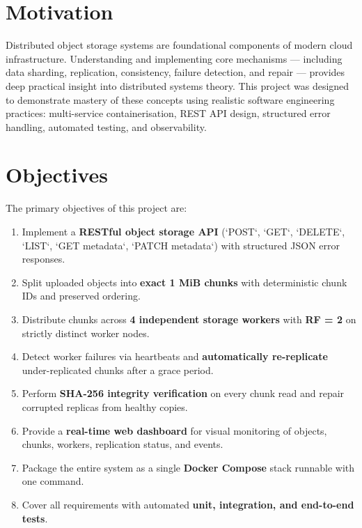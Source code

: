 \documentclass[12pt,a4paper]{report}
\begin{document}
\section{Motivation}

Distributed object storage systems are foundational components of modern cloud infrastructure. Understanding and implementing core mechanisms --- including data sharding, replication, consistency, failure detection, and repair --- provides deep practical insight into distributed systems theory. This project was designed to demonstrate mastery of these concepts using realistic software engineering practices: multi-service containerisation, REST API design, structured error handling, automated testing, and observability.

\section{Objectives}

The primary objectives of this project are:

\begin{enumerate}[leftmargin=*, label=\textbf{O\arabic*.}]
  \item Implement a \textbf{RESTful object storage API} (`POST`, `GET`, `DELETE`, `LIST`, `GET metadata`, `PATCH metadata`) with structured JSON error responses.
  \item Split uploaded objects into \textbf{exact 1 MiB chunks} with deterministic chunk IDs and preserved ordering.
  \item Distribute chunks across \textbf{4 independent storage workers} with \textbf{RF = 2} on strictly distinct worker nodes.
  \item Detect worker failures via heartbeats and \textbf{automatically re-replicate} under-replicated chunks after a grace period.
  \item Perform \textbf{SHA-256 integrity verification} on every chunk read and repair corrupted replicas from healthy copies.
  \item Provide a \textbf{real-time web dashboard} for visual monitoring of objects, chunks, workers, replication status, and events.
  \item Package the entire system as a single \textbf{Docker Compose} stack runnable with one command.
  \item Cover all requirements with automated \textbf{unit, integration, and end-to-end tests}.
\end{enumerate}
\end{document}
